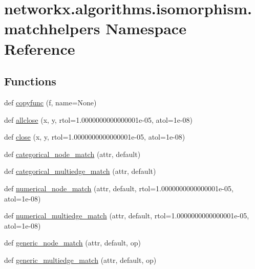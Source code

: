 \hypertarget{namespacenetworkx_1_1algorithms_1_1isomorphism_1_1matchhelpers}{}\section{networkx.\+algorithms.\+isomorphism.\+matchhelpers Namespace Reference}
\label{namespacenetworkx_1_1algorithms_1_1isomorphism_1_1matchhelpers}
\subsection*{Functions}
\begin{DoxyCompactItemize}
\item 
def \hyperlink{namespacenetworkx_1_1algorithms_1_1isomorphism_1_1matchhelpers_a0c57c65af9335af3c771365d68062a1e}{copyfunc} (f, name=None)
\item 
def \hyperlink{namespacenetworkx_1_1algorithms_1_1isomorphism_1_1matchhelpers_af7edc13daad9ab9f573fff1c67173d90}{allclose} (x, y, rtol=1.\+0000000000000001e-\/05, atol=1e-\/08)
\item 
def \hyperlink{namespacenetworkx_1_1algorithms_1_1isomorphism_1_1matchhelpers_a89ea313e6d2cabbf490ba429b2f1bd4e}{close} (x, y, rtol=1.\+0000000000000001e-\/05, atol=1e-\/08)
\item 
def \hyperlink{namespacenetworkx_1_1algorithms_1_1isomorphism_1_1matchhelpers_a6e1c6d7bfbb4b060c1761c05c9ab4db7}{categorical\+\_\+node\+\_\+match} (attr, default)
\item 
def \hyperlink{namespacenetworkx_1_1algorithms_1_1isomorphism_1_1matchhelpers_a259f6e2f465c74435d24ff4ab03deb11}{categorical\+\_\+multiedge\+\_\+match} (attr, default)
\item 
def \hyperlink{namespacenetworkx_1_1algorithms_1_1isomorphism_1_1matchhelpers_ab364ce2d808dd82e81f22293eacf552c}{numerical\+\_\+node\+\_\+match} (attr, default, rtol=1.\+0000000000000001e-\/05, atol=1e-\/08)
\item 
def \hyperlink{namespacenetworkx_1_1algorithms_1_1isomorphism_1_1matchhelpers_a213b9d97a1efe294db3852d8e5a68aa7}{numerical\+\_\+multiedge\+\_\+match} (attr, default, rtol=1.\+0000000000000001e-\/05, atol=1e-\/08)
\item 
def \hyperlink{namespacenetworkx_1_1algorithms_1_1isomorphism_1_1matchhelpers_a3641189500aeeb4cb970a3b23988b0b3}{generic\+\_\+node\+\_\+match} (attr, default, op)
\item 
def \hyperlink{namespacenetworkx_1_1algorithms_1_1isomorphism_1_1matchhelpers_a23f2515abfe9edcda3beba0403fb1ad5}{generic\+\_\+multiedge\+\_\+match} (attr, default, op)
\end{DoxyCompactItemize}
